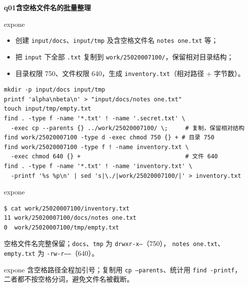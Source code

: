 \documentclass[11pt,a4paper,fontset=none]{ctexart}
\newcommand{\hwbanner}[3]{%
  \par\vspace{1.1em}
  \begin{tcolorbox}[enhanced, colback=#1!8, colframe=#1!75!black,
    boxrule=0.8pt, arc=2pt, left=7pt, right=7pt, top=4pt, bottom=4pt,
    before skip=1.1em]
    {\bfseries\color{#1!75!black}#2\qquad #3}
  \end{tcolorbox}
  \par\vspace{0.1em}\noindent\ignorespaces
}
\newcommand{\sublabel}[2]{%
  \par\vspace{0.8em}\noindent{\bfseries\color{#1!75!black}#2}\par\nobreak\vspace{0.25em}\noindent\ignorespaces
}
\begin{document}
\hwbanner{expone}{q01}{含空格文件名的批量整理}
\begin{reqbox}{expone}
\begin{itemize}[leftmargin=1.4em, itemsep=1pt]
  \item 创建 \texttt{input/docs}、\texttt{input/tmp} 及含空格文件名 \texttt{notes one.txt} 等；
  \item 把 \texttt{input} 下全部 \texttt{.txt} 复制到 \texttt{work/25020007100/}，保留相对目录结构；
  \item 目录权限 750、文件权限 640，生成 \texttt{inventory.txt}（相对路径 + 字节数）。
\end{itemize}
\end{reqbox}
\sublabel{expone}{\faTerminal\ 关键命令}
\begin{lstlisting}[style=shell]
mkdir -p input/docs input/tmp
printf 'alpha\nbeta\n' > "input/docs/notes one.txt"
touch input/tmp/empty.txt
find . -type f -name '*.txt' ! -name '.secret.txt' \
  -exec cp --parents {} ../work/25020007100/ \;     # 复制，保留相对结构
find work/25020007100 -type d -exec chmod 750 {} + # 目录 750
find work/25020007100 -type f ! -name inventory.txt \
  -exec chmod 640 {} +                              # 文件 640
find . -type f -name '*.txt' ! -name 'inventory.txt' \
  -printf '%s %p\n' | sed 's|\./|work/25020007100/|' > inventory.txt
\end{lstlisting}
\begin{resbox}{expone}
\begin{lstlisting}[style=output]
$ cat work/25020007100/inventory.txt
11 work/25020007100/docs/notes one.txt
0  work/25020007100/tmp/empty.txt
\end{lstlisting}
空格文件名完整保留；\texttt{docs}、\texttt{tmp} 为 \texttt{drwxr-x---}（750），
\texttt{notes one.txt}、\texttt{empty.txt} 为 \texttt{-rw-r-----}（640）。
\end{resbox}
\begin{trapbox}{expone}
  含空格路径全程加引号；复制用 \texttt{cp --parents}、统计用 \texttt{find -printf}，
  二者都不按空格分词，避免文件名被截断。
\end{trapbox}
\end{document}
